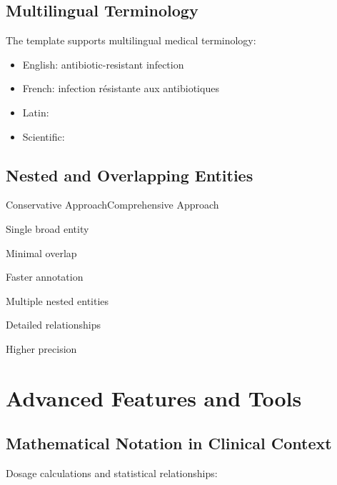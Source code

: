 \documentclass[11pt,a4paper]{article}
\begin{document}
\subsection{Multilingual Terminology}

The template supports multilingual medical terminology:

\begin{itemize}
    \item English: \textenglish{antibiotic-resistant infection}
    \item French: \textfrench{infection résistante aux antibiotiques}  
    \item Latin: 
    \item Scientific: 
\end{itemize}

\subsection{Nested and Overlapping Entities}


\begin{comparisonlist}{Conservative Approach}{Comprehensive Approach}
    \item Single broad entity
    \item Minimal overlap
    \item Faster annotation
\nextcolumn
    \item Multiple nested entities
    \item Detailed relationships  
    \item Higher precision
\end{comparisonlist}

\section{Advanced Features and Tools}

\subsection{Mathematical Notation in Clinical Context}

Dosage calculations and statistical relationships:
\end{document}

